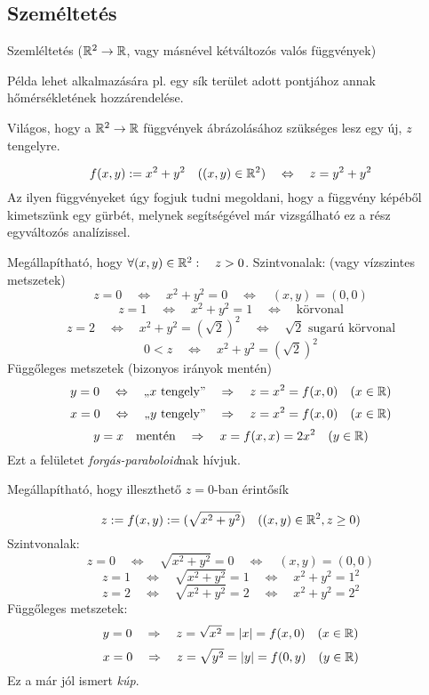 \documentclass[a4paper,11.5pt]{article}
\begin{document}
	\subsection{Személtetés}
	\begin{example}
		Szemléltetés ($\mathbb{R}^2\to\mathbb{R}$, vagy másnével kétváltozós valós függvények)
	\end{example}
	\begin{note}
		Példa lehet alkalmazására pl. egy sík terület adott pontjához annak hőmérsékletének hozzárendelése.
	\end{note}
	\begin{note}
		Világos, hogy a $\mathbb{R}^2\to\mathbb{R}$ függvények ábrázolásához szükséges lesz egy új, $z$ tengelyre.
	\end{note}
	\begin{task}
		\[ f(x,y):=x^2+y^2\quad ((x,y)\in\mathbb{R}^2)\quad \Leftrightarrow\quad z=y^2+y^2 \]
		Az ilyen függvényeket úgy fogjuk tudni megoldani, hogy a függvény képéből kimetszünk egy gürbét, melynek segítségével már vizsgálható ez a rész egyváltozós analízissel.
		
		\medskip
		Megállapítható, hogy $\forall (x,y)\in\mathbb{R}^2:\quad z>0$.
		\smallskip
		Szintvonalak: (vagy vízszintes metszetek)
		\[ z=0\quad \Leftrightarrow\quad x^2+y^2=0\quad \Leftrightarrow\quad (x,y)=(0,0) \]
		\[ z=1\quad \Leftrightarrow\quad x^2+y^2=1\quad \Leftrightarrow\quad \text{körvonal} \]
		\[ z=2\quad \Leftrightarrow\quad x^2+y^2=(\sqrt{2})^2\quad \Leftrightarrow\quad \text{$\sqrt{2}$ sugarú körvonal} \]
		\[ 0<z\quad \Leftrightarrow\quad x^2+y^2=(\sqrt{2})^2 \]
		Függőleges metszetek (bizonyos irányok mentén)
		\[ y=0\quad \Leftrightarrow\quad \text{,,$x$ tengely''}\quad \Rightarrow\quad z=x^2=f(x,0)\quad (x\in\mathbb{R}) \]
		\[ x=0\quad \Leftrightarrow\quad \text{,,$y$ tengely''}\quad \Rightarrow\quad z=x^2=f(x,0)\quad (x\in\mathbb{R}) \]
		\[ y=x\quad \text{mentén}\quad \Rightarrow\quad x=f(x,x)=2x^2\quad (y\in\mathbb{R}) \]
		Ezt a felületet \textit{forgás-paraboloid}nak hívjuk.
	\end{task}
	\begin{note}
		Megállapítható, hogy illeszthető $z=0$-ban érintősík 
	\end{note}
	\begin{task}
		\[ z:=f(x,y):=(\sqrt{x^2+y^2})\quad ((x,y)\in\mathbb{R}^2, z\geq 0) \]
		Szintvonalak:
		\[ z=0\quad \Leftrightarrow\quad \sqrt{x^2+y^2}=0\quad \Leftrightarrow\quad (x,y)=(0,0) \]
		\[ z=1\quad \Leftrightarrow\quad \sqrt{x^2+y^2}=1\quad \Leftrightarrow\quad x^2+y^2=1^2 \]
		\[ z=2\quad \Leftrightarrow\quad \sqrt{x^2+y^2}=2\quad \Leftrightarrow\quad x^2+y^2=2^2 \]
		Függőleges metszetek:
		\[ y=0\quad \Rightarrow\quad z=\sqrt{x^2}=|x|=f(x,0)\quad (x\in\mathbb{R}) \]
		\[ x=0\quad \Rightarrow\quad z=\sqrt{y^2}=|y|=f(0,y)\quad (y\in\mathbb{R}) \]
		Ez a már jól ismert \textit{kúp}.
	\end{task}
\end{document}
